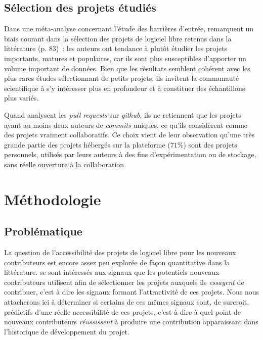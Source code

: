 \documentclass[dvipsnames]{llncs}
\newcommand{\en}[1]{\foreignlanguage{english}{\emph{#1}}}
\begin{document}
    \subsection{Sélection des projets étudiés}

    Dans une méta-analyse concernant l'étude des barrières d'entrée, \textcite{barriers-meta-2015} remarquent
    un biais courant dans la sélection des projets de logiciel libre retenus dans la littérature (p. 83) : les
    auteurs ont tendance à plutôt étudier les projets importants, matures et populaires, car ils sont plus
    susceptibles d'apporter un volume important de données. Bien que les résultats semblent cohérent avec les
    plus rares études sélectionnant de petits projets, ils invitent la communauté scientifique à s'y
    intéresser plus en profondeur et à constituer des échantillons plus variés.

    Quand \textcite{mining-github-2014} analysent les \en{pull requests} sur \en{github}, ils ne retiennent
    que les projets ayant au moins deux auteurs de \en{commits} uniques, ce qu'ils considèrent comme des
    projets vraiment collaboratifs. Ce choix vient de leur observation qu'une très grande partie des projets
    hébergés sur la plateforme ($71\%$) sont des projets personnels, utilisés par leurs auteurs à des fins
    d'expérimentation ou de stockage, sans réelle ouverture à la collaboration.

    \section{Méthodologie}

    \subsection{Problématique}

    La question de l'accessibilité des projets de logiciel libre pour les nouveaux contributeurs est encore
    assez peu explorée de façon quantitative dans la littérature. \textcite{signals-2019} se sont intéressés
    aux signaux que les potentiels nouveaux contributeurs utilisent afin de sélectionner les projets auxquels
    ils \emph{essayent} de contribuer, c'est à dire les signaux formant l'attractivité de ces projets. Nous
    nous attacherons ici à déterminer si certains de ces mêmes signaux sont, de surcroit, prédictifs d'une
    réelle accessibilité de ces projets, c'est à dire à quel point de nouveaux contributeurs
    \emph{réussissent} à produire une contribution apparaissant dans l'historique de développement du projet.
\end{document}
